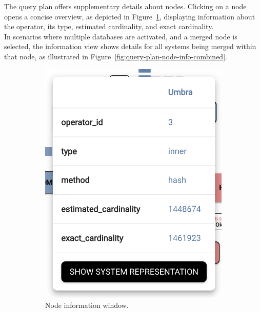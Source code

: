 
The query plan offers supplementary details about nodes. Clicking on a node opens a concise overview, as depicted in Figure~\ref{fig:query-plan-node-info-a}, displaying information about the operator, its type, estimated cardinality, and exact cardinality.\\
In scenarios where multiple databases are activated, and a merged node is selected, the information view shows details for all systems being merged within that node, as illustrated in Figure~\ref{fig:query-plan-node-info-combined}.

\begin{figure}[h]
  \centering
  \begin{subfigure}[b]{0.4\linewidth}
    \includegraphics[width=0.8\linewidth]{figures/query-plan-node-info.png}
    \caption{Node information window.}
      \label{fig:query-plan-node-info-a}
  \end{subfigure}
  \hspace{1cm} %
  \begin{subfigure}[b]{0.4\linewidth}

\end{subfigure}
\end{figure}

